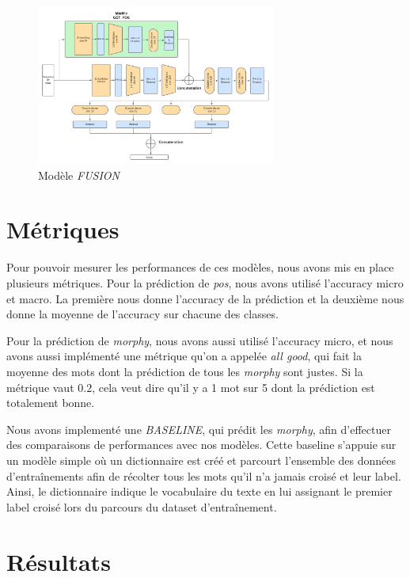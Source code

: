 \documentclass[a4paper]{article}
\begin{document}
\begin{figure}[H]
    \centering
    \includegraphics[width=0.7\textwidth]{get_morphy_fusion.png}
    \caption{Modèle \textit{FUSION}}
    \label{fig: model fusion}
\end{figure}


\section{Métriques}

Pour pouvoir mesurer les performances de ces modèles, nous avons mis en place plusieurs métriques. Pour la prédiction de 
\textit{pos}, nous avons utilisé l'accuracy micro et macro. La première nous donne l'accuracy de la prédiction et la deuxième
nous donne la moyenne de l'accuracy sur chacune des classes. 

Pour la prédiction de \textit{morphy}, nous avons aussi utilisé l'accuracy micro, et nous avons aussi implémenté une 
métrique qu'on a appelée \textit{all good}, qui fait la moyenne des mots dont la prédiction de tous les \textit{morphy}
sont justes. Si la métrique vaut $0.2$, cela veut dire qu'il y a 1 mot sur 5 dont la prédiction est totalement bonne.

Nous avons implementé une \textit{BASELINE}, qui prédit les \textit{morphy}, afin d'effectuer des comparaisons de performances avec nos modèles.
Cette baseline s'appuie sur un modèle simple où un dictionnaire est créé et parcourt l'ensemble des données d'entraînements afin de 
récolter tous les mots qu'il n'a jamais croisé et leur label. Ainsi, le dictionnaire indique le vocabulaire du texte en lui assignant
le premier label croisé lors du parcours du dataset d'entraînement.

\section{Résultats}
\end{document}

